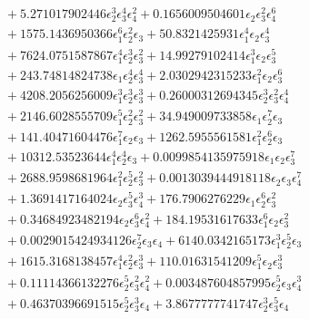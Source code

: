 \documentclass[10pt]{article}
\begin{document}
\begin{align*}
&{}  + 5.271017902446 \epsilon_{2}^{3} \epsilon_{3}^{4} \epsilon_{4}^{2} + 0.1656009504601 \epsilon_{2} \epsilon_{3}^{2} \epsilon_{4}^{6} \\
&{}  + 1575.1436950366 \epsilon_{1}^{6} \epsilon_{2}^{2} \epsilon_{3} + 50.8321425931 \epsilon_{1}^{4} \epsilon_{2} \epsilon_{3}^{4} \\
&{}  + 7624.0751587867 \epsilon_{1}^{4} \epsilon_{2}^{3} \epsilon_{3}^{2} + 14.99279102414 \epsilon_{1}^{3} \epsilon_{2} \epsilon_{3}^{5} \\
&{}  + 243.74814824738 \epsilon_{1} \epsilon_{2}^{4} \epsilon_{3}^{4} + 2.0302942315233 \epsilon_{1}^{2} \epsilon_{2} \epsilon_{3}^{6} \\
&{}  + 4208.2056256009 \epsilon_{1}^{3} \epsilon_{2}^{3} \epsilon_{3}^{3} + 0.26000312694345 \epsilon_{2}^{3} \epsilon_{3}^{2} \epsilon_{4}^{4} \\
&{}  + 2146.6028555709 \epsilon_{1}^{5} \epsilon_{2}^{2} \epsilon_{3}^{2} + 34.949009733858 \epsilon_{1} \epsilon_{2}^{7} \epsilon_{3} \\
&{}  + 141.40471604476 \epsilon_{1}^{7} \epsilon_{2} \epsilon_{3} + 1262.5955561581 \epsilon_{1}^{2} \epsilon_{2}^{6} \epsilon_{3} \\
&{}  + 10312.53523644 \epsilon_{1}^{4} \epsilon_{2}^{4} \epsilon_{3} + 0.0099854135975918 \epsilon_{1} \epsilon_{2} \epsilon_{3}^{7} \\
&{}  + 2688.9598681964 \epsilon_{1}^{2} \epsilon_{2}^{5} \epsilon_{3}^{2} + 0.0013039444918118 \epsilon_{2} \epsilon_{3} \epsilon_{4}^{7} \\
&{}  + 1.3691417164024 \epsilon_{2} \epsilon_{3}^{5} \epsilon_{4}^{3} + 176.7906276229 \epsilon_{1} \epsilon_{2}^{6} \epsilon_{3}^{2} \\
&{}  + 0.34684923482194 \epsilon_{2} \epsilon_{3}^{6} \epsilon_{4}^{2} + 184.19531617633 \epsilon_{1}^{6} \epsilon_{2} \epsilon_{3}^{2} \\
&{}  + 0.0029015424934126 \epsilon_{2}^{7} \epsilon_{3} \epsilon_{4} + 6140.0342165173 \epsilon_{1}^{3} \epsilon_{2}^{5} \epsilon_{3} \\
&{}  + 1615.3168138457 \epsilon_{1}^{4} \epsilon_{2}^{2} \epsilon_{3}^{3} + 110.01631541209 \epsilon_{1}^{5} \epsilon_{2} \epsilon_{3}^{3} \\
&{}  + 0.11114366132276 \epsilon_{2}^{5} \epsilon_{3}^{2} \epsilon_{4}^{2} + 0.003487604857995 \epsilon_{2}^{5} \epsilon_{3} \epsilon_{4}^{3} \\
&{}  + 0.46370396691515 \epsilon_{2}^{5} \epsilon_{3}^{3} \epsilon_{4} + 3.8677777741747 \epsilon_{2}^{3} \epsilon_{3}^{5} \epsilon_{4} \\

\end{align*}
\end{document}
